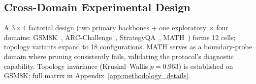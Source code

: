 \subsection{Cross-Domain Experimental Design}
\label{sec:cross_domain_design}

A $3 \times 4$ factorial design (two primary backbones + one exploratory $\times$ four domains: GSM8K~\citep{cobbe_gsm8k_2021}, ARC-Challenge~\citep{clark_arc_2018}, StrategyQA~\citep{geva_strategyqa_2021}, MATH~\citep{hendrycks_math_2021}) forms 12 cells; topology variants expand to 18 configurations. MATH serves as a boundary-probe domain where pruning consistently fails, validating the protocol's diagnostic capability. Topology invariance (Kruskal--Wallis $p = 0.963$) is established on GSM8K; full matrix in Appendix~\ref{app:methodology_details}.
